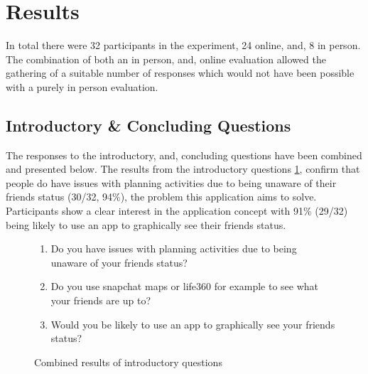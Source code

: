 \section{Results}
In total there were 32 participants in the experiment, 24 online, and, 8 in person. The combination of both an in person, and, online evaluation allowed the gathering of a suitable number of responses which would not have been possible with a purely in person evaluation.

\subsection{Introductory \& Concluding Questions}
The responses to the introductory, and, concluding questions have been combined and presented below. The results from the introductory questions \ref{fig:introAns}, confirm that people do have issues with planning activities due to being unaware of their friends status (30/32, 94\%), the problem this application aims to solve. Participants show a clear interest in the application concept with 91\% (29/32) being likely to use an app to graphically see their friends status. 

\begin{figure}[H]

\begin{enumerate}
    \item Do you have issues with planning activities due to being unaware of your friends status?
    \item Do you use snapchat maps or life360 for example to see what your friends are up to?
    \item Would you be likely to use an app to graphically see your friends status?
\end{enumerate}

\caption{Combined results of introductory questions}
\label{fig:introAns}
\end{figure}
\FloatBarrier

